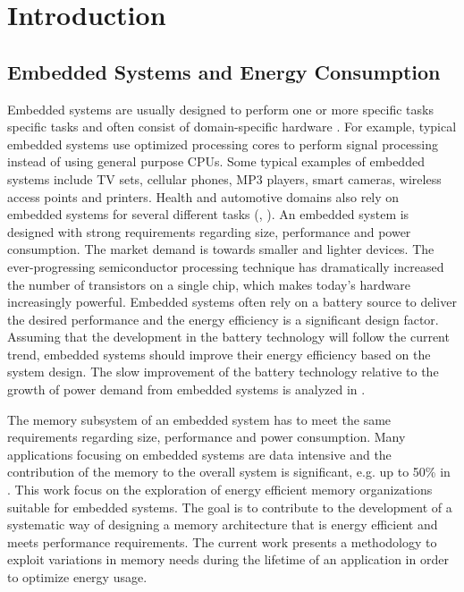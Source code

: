  \chapter{Introduction}
\label{intro}


\section{Embedded Systems and Energy Consumption}

Embedded systems are usually designed to perform one or more specific tasks specific tasks and often consist of domain-specific hardware \cite{gajski1994specification}.
For example, typical embedded systems use optimized processing cores to perform signal processing instead of using general purpose CPUs.
Some typical examples of embedded systems include TV sets, cellular phones, MP3 players, smart cameras, wireless access points and printers. 
Health and automotive domains also rely on embedded systems for several different tasks (\cite{istepanian2004guest}, \cite{sangiovanni2007embedded}).
An embedded system is designed with strong requirements regarding size, performance and power consumption.
The market demand is towards smaller and lighter devices.
The ever-progressing semiconductor processing technique has dramatically increased the number of transistors on a single chip, which makes today's hardware increasingly powerful.
Embedded systems often rely on a battery source to deliver the desired performance and the energy efficiency is a significant design factor.
Assuming that the development in the battery technology will follow the current trend, embedded systems should improve their energy efficiency based on the system design.
The slow improvement of the battery technology relative to the growth of power
demand from embedded systems is analyzed in \cite{park2001battery}.

The memory subsystem of an embedded system has to meet the same requirements regarding size, performance and power consumption.
Many applications focusing on embedded systems are data intensive and the contribution of the memory to the overall system is significant, e.g. up to 50\% in \cite{Ben99}.
This work focus on the exploration of energy efficient memory organizations suitable for embedded systems.
The goal is to contribute to the development of a systematic way of designing a memory architecture that is energy efficient and meets performance requirements.
The current work presents a methodology to exploit variations in memory needs during the lifetime of an application in order to optimize energy usage.

